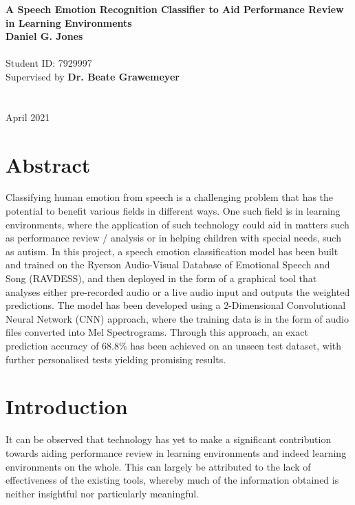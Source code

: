 \documentclass[12pt]{article}
\begin{document}

\begin{center}
	\vspace*{1cm}
	\Huge \textbf{A Speech Emotion Recognition Classifier to Aid Performance Review in Learning Environments} \\[1em]
	\vspace{5cm}
	\LARGE \textbf{Daniel G. Jones}
	\\
	\vspace{0.3cm}
	\large 
	\\
	\large Student ID: 7929997
	\\
	\vspace{3cm}
	\large Supervised by \textbf{Dr. Beate Grawemeyer}
	\\
	\vspace{0.3cm}
	\large 
	\\
	\vspace{3cm}
	\large
	\\
	April 2021
\end{center}
\newpage
\tableofcontents
\newpage
\section{Abstract}

Classifying human emotion from speech is a challenging problem that has the potential to benefit various fields in different ways. One such field is in learning environments, where the application of such technology could aid in matters such as performance review / analysis or in helping children with special needs, such as autism. In this project, a speech emotion classification model has been built and trained on the Ryerson Audio-Visual Database of Emotional Speech and Song (RAVDESS), and then deployed in the form of a graphical tool that analyses either pre-recorded audio or a live audio input and outputs the weighted predictions. The model has been developed using a 2-Dimensional Convolutional Neural Network (CNN) approach, where the training data is in the form of audio files converted into Mel Spectrograms. Through this approach, an exact prediction accuracy of 68.8\% has been achieved on an unseen test dataset, with further personalised tests yielding promising results.


\section{Introduction}

It can be observed that technology has yet to make a significant contribution towards aiding performance review in learning environments and indeed learning environments on the whole. This can largely be attributed to the lack of effectiveness of the existing tools, whereby much of the information obtained is neither insightful nor particularly meaningful.
\\
\end{document}
